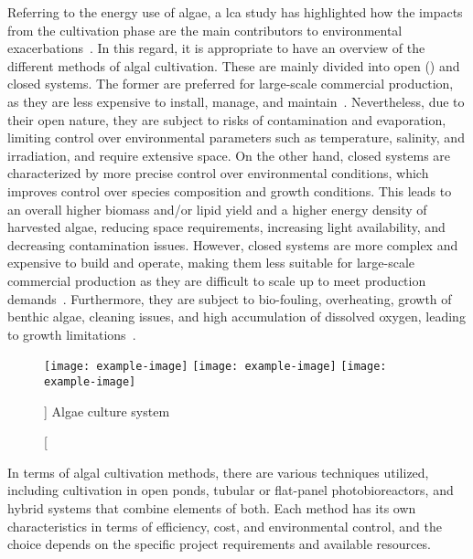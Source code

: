 Referring to the energy use of algae, a \gls{lca} study has highlighted how the impacts from the cultivation phase are the main contributors to environmental exacerbations~\parencite{clarens_Environmental_2010}. In this regard, it is appropriate to have an overview of the different methods of algal cultivation. These are mainly divided into open () and closed systems. The former are preferred for large-scale commercial production, as they are less expensive to install, manage, and maintain~\parencite{roselet_Comparison_2013}. Nevertheless, due to their open nature, they are subject to risks of contamination and evaporation, limiting control over environmental parameters such as temperature, salinity, and irradiation, and require extensive space. On the other hand, closed systems are characterized by more precise control over environmental conditions, which improves control over species composition and growth conditions. This leads to an overall higher biomass and/or lipid yield and a higher energy density of harvested algae, reducing space requirements, increasing light availability, and decreasing contamination issues. However, closed systems are more complex and expensive to build and operate, making them less suitable for large-scale commercial production as they are difficult to scale up to meet production demands~\parencite{resurreccion_Comparison_2012}. Furthermore, they are subject to bio-fouling, overheating, growth of benthic algae, cleaning issues, and high accumulation of dissolved oxygen, leading to growth limitations~\parencite{narala_Comparison_2016}.

\begin{figure}[H]
\centering
		{\texttt{[image: example-image]}}%
\hspace*{\trehbtwsfig}%
		{\texttt{[image: example-image]}}%
\hspace*{\trehbtwsfig}%
		{\texttt{[image: example-image]}}%
\caption%
[]%
{Algae culture system}
\label{fig:}
\end{figure}


In terms of algal cultivation methods, there are various techniques utilized, including cultivation in open ponds, tubular or flat-panel photobioreactors, and hybrid systems that combine elements of both. Each method has its own characteristics in terms of efficiency, cost, and environmental control, and the choice depends on the specific project requirements and available resources.

